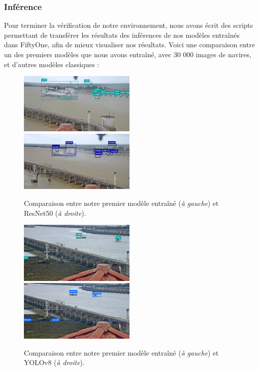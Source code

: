 \subsubsection{Inférence}

Pour terminer la vérification de notre environnement, nous avons écrit des scripts permettant de 
transférer les résultats des inférences de nos modèles entraînés dans FiftyOne, afin de mieux visualiser
nos résultats. Voici une comparaison entre un des premiers modèles que nous avons entraîné, avec 30 000 images 
de navires, et d'autres modèles classiques : 

\begin{figure}[H]
        \includegraphics[width=0.5\textwidth]{./img/first_inference.png}
        \includegraphics[width=0.5\textwidth]{./img/resnet_inference.png}
        \caption{Comparaison entre notre premier modèle entraîné (\textit{à gauche}) et ResNet50 (\textit{à droite}).}
\end{figure}

\begin{figure}[H]
    \includegraphics[width=0.5\textwidth]{./img/first_inference2.png}
    \includegraphics[width=0.5\textwidth]{./img/yolov8_inference.png}
    \caption{Comparaison entre notre premier modèle entraîné (\textit{à gauche}) et YOLOv8 (\textit{à droite}).}
\end{figure}

